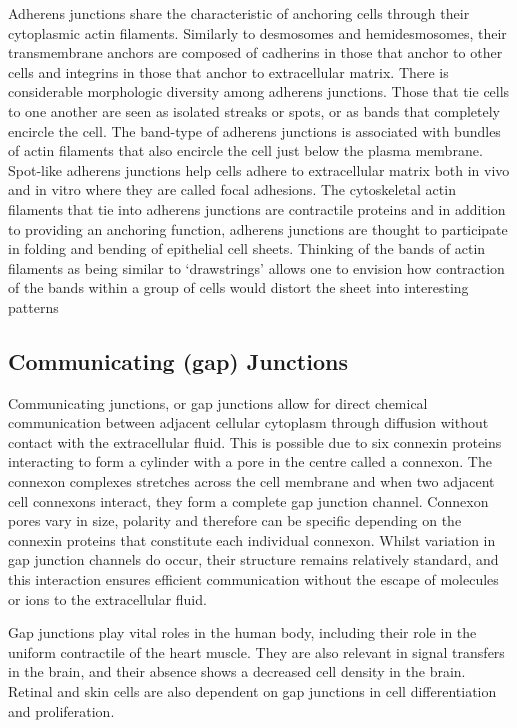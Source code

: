 Adherens junctions share the characteristic of anchoring cells through their cytoplasmic actin filaments. Similarly to desmosomes and hemidesmosomes, their transmembrane anchors are composed of cadherins in those that anchor to other cells and integrins in those that anchor to extracellular matrix. There is considerable morphologic diversity among adherens junctions. Those that tie cells to one another are seen as isolated streaks or spots, or as bands that completely encircle the cell. The band-type of adherens junctions is associated with bundles of actin filaments that also encircle the cell just below the plasma membrane. Spot-like adherens junctions help cells adhere to extracellular matrix both in vivo and in vitro where they are called focal adhesions. The cytoskeletal actin filaments that tie into adherens junctions are contractile proteins and in addition to providing an anchoring function, adherens junctions are thought to participate in folding and bending of epithelial cell sheets. Thinking of the bands of actin filaments as being similar to `drawstrings' allows one to envision how contraction of the bands within a group of cells would distort the sheet into interesting patterns

\hypertarget{communicating-gap-junctions}{%
\subsection{Communicating (gap) Junctions}\label{communicating-gap-junctions}}

Communicating junctions, or gap junctions allow for direct chemical communication between adjacent cellular cytoplasm through diffusion without contact with the extracellular fluid. This is possible due to six connexin proteins interacting to form a cylinder with a pore in the centre called a connexon. The connexon complexes stretches across the cell membrane and when two adjacent cell connexons interact, they form a complete gap junction channel. Connexon pores vary in size, polarity and therefore can be specific depending on the connexin proteins that constitute each individual connexon. Whilst variation in gap junction channels do occur, their structure remains relatively standard, and this interaction ensures efficient communication without the escape of molecules or ions to the extracellular fluid.

Gap junctions play vital roles in the human body, including their role in the uniform contractile of the heart muscle. They are also relevant in signal transfers in the brain, and their absence shows a decreased cell density in the brain. Retinal and skin cells are also dependent on gap junctions in cell differentiation and proliferation.

